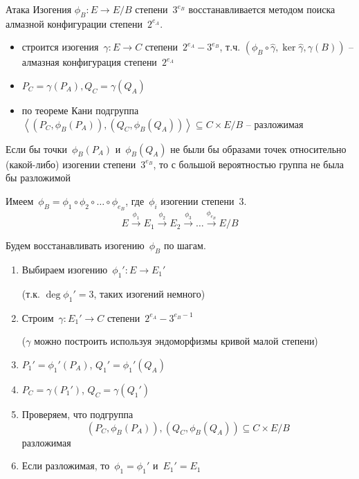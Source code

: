 \documentclass{beamer}
\begin{document}
\begin{frame}{Атака}
	Изогения $\phi_B: E \rightarrow E/B$ степени~$3^{e_B}$ восстанавливается методом поиска алмазной конфигурации степени~$2^{{e_A}}$.
	
	\begin{itemize}
		\item строится изогения~$\gamma: E \rightarrow C$ степени~$2^{{e_A}} - 3^{{e_B}}$, т.ч. $(\phi_B \circ \widehat{\gamma}, \ker{\widehat{\gamma}}, \gamma(B))$ -- алмазная конфигурация степени~$2^{e_A}$
		\item $P_C = \gamma(P_A), Q_C = \gamma(Q_A)$
		\item по теореме Кани подгруппа $\left< (P_C, \phi_B(P_A)), (Q_C, \phi_B(Q_A)) \right> \subseteq C \times E/B$ -- разложимая
	\end{itemize}
\vspace{1em}
	 Если бы точки~$\phi_B(P_A)$ и~$\phi_B(Q_A)$ не были бы образами точек относительно (какой-либо) изогении степени~$3^{e_B}$, то с большой вероятностью группа не была бы разложимой
\end{frame}


\begin{frame}{}
Имеем~$\phi_B = \phi_1 \circ \phi_2 \circ \ldots \circ \phi_{e_B}$, где~$\phi_i$ изогении степени~$3$.
\[
E \xrightarrow{\phi_1} E_1  \xrightarrow{\phi_2} E_2 \xrightarrow{\phi_3} \ldots \xrightarrow{\phi_{e_B}} E/B
\]

Будем восстанавливать изогению~$\phi_B$ по шагам.

\begin{enumerate}
	\item Выбираем изогению~$\phi_1': E \rightarrow E_1'$ 
	
	(т.к. $\deg \phi_1' = 3$, таких изогений немного)
	\item Строим~$\gamma: E_1' \rightarrow C$ степени~$2^{e_A} - 3^{e_B-1}$
	
	($\gamma$ можно построить используя эндоморфизмы кривой малой степени)
	\item $P_1' = \phi_1'(P_A)$, $Q_1' = \phi_1'(Q_A)$
	\item $P_C = \gamma(P_1')$, $Q_C = \gamma(Q_1')$
	\item Проверяем, что подгруппа \[(P_C, \phi_B(P_A)), (Q_C, \phi_B(Q_A)) \subseteq C \times E/B\] разложимая
	\item Если разложимая, то~$\phi_1 = \phi_1'$ и~$E_1' = E_1$
\end{enumerate}

\end{frame}
\end{document}
